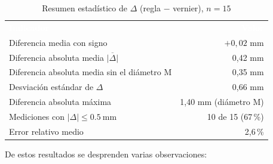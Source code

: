\documentclass[12pt,a4paper]{article}
\newcommand{\encab}[1]{\textcolor{white}{\sffamily\bfseries #1}}
\begin{document}
\begin{table}[!htb]
	\centering
	\caption{Resumen estadístico de $\Delta$ (regla $-$ vernier),
		$n=15$}\label{tab:estadistica}
	\small
	\begin{tabular}{l r}
		\rowcolor{darkblue}
		\encab{Indicador}                                  & \encab{Valor}        \\
		Diferencia media con signo                         & $+0{,}02$ mm         \\
		Diferencia absoluta media $\overline{|\Delta|}$    & 0,42 mm              \\
		Diferencia absoluta media sin el diámetro M        & 0,35 mm              \\
		Desviación estándar de $\Delta$                    & 0,66 mm              \\
		Diferencia absoluta máxima                         & 1,40 mm (diámetro M) \\
		Mediciones con $|\Delta|\le\SI{0.5}{\milli\metre}$ & 10 de 15 (67\,\%)    \\
		Error relativo medio                               & 2,6\,\%              \\
	\end{tabular}
\end{table}

De estos resultados se desprenden varias observaciones:
\end{document}
